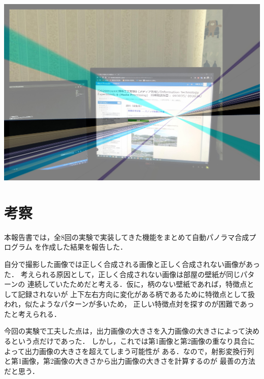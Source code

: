 \documentclass[11pt]{jarticle}
\begin{document}
\includegraphics[scale=.11]{./img/desktopout.jpg}

\section{考察}

本報告書では，全8回の実験で実装してきた機能をまとめて自動パノラマ合成プログラム
を作成した結果を報告した．

自分で撮影した画像では正しく合成される画像と正しく合成されない画像があった．
考えられる原因として，正しく合成されない画像は部屋の壁紙が同じパターンの
連続していたためだと考える．仮に，柄のない壁紙であれば，特徴点として記録されないが
上下左右方向に変化がある柄であるために特徴点として扱われ，似たようなパターンが多いため，
正しい特徴点対を探すのが困難であったと考えられる．

今回の実験で工夫した点は，出力画像の大きさを入力画像の大きさによって決めるという点だけであった．
しかし，これでは第1画像と第2画像の重なり具合によって出力画像の大きさを超えてしまう可能性が
ある．なので，射影変換行列と第1画像，第2画像の大きさから出力画像の大きさを計算するのが
最善の方法だと思う．
\end{document}
